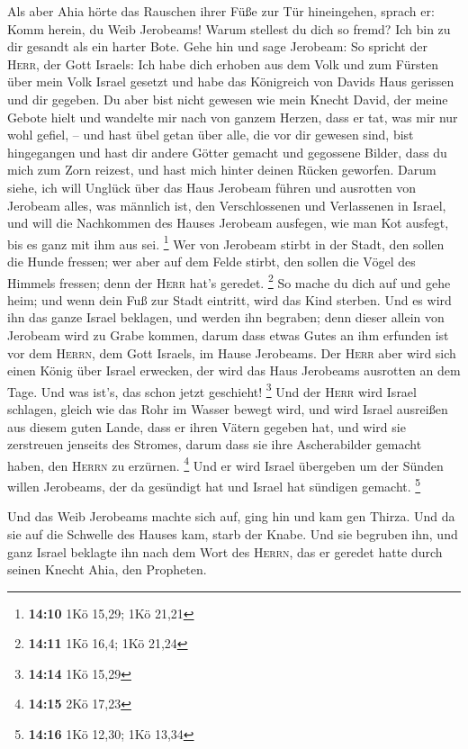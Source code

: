  Als aber Ahia hörte das Rauschen ihrer Füße zur Tür
hineingehen, sprach er: Komm herein, du Weib Jerobeams! Warum stellest
du dich so fremd? Ich bin zu dir gesandt als ein harter Bote.
 Gehe hin und sage Jerobeam: So spricht der \textsc{Herr},
der Gott Israels: Ich habe dich erhoben aus dem Volk und zum Fürsten
über mein Volk Israel gesetzt  und habe das Königreich von
Davids Haus gerissen und dir gegeben. Du aber bist nicht gewesen wie
mein Knecht David, der meine Gebote hielt und wandelte mir nach von
ganzem Herzen, dass er tat, was mir nur wohl gefiel, -- 
und hast übel getan über alle, die vor dir gewesen sind, bist
hingegangen und hast dir andere Götter gemacht und gegossene Bilder,
dass du mich zum Zorn reizest, und hast mich hinter deinen Rücken
geworfen.  Darum siehe, ich will Unglück über das Haus
Jerobeam führen und ausrotten von Jerobeam alles, was männlich ist, den
Verschlossenen und Verlassenen in Israel, und will die Nachkommen des
Hauses Jerobeam ausfegen, wie man Kot ausfegt, bis es ganz mit ihm aus
sei. \footnote{\textbf{14:10} 1Kö 15,29; 1Kö 21,21}  Wer
von Jerobeam stirbt in der Stadt, den sollen die Hunde fressen; wer aber
auf dem Felde stirbt, den sollen die Vögel des Himmels fressen; denn der
\textsc{Herr} hat's geredet. \footnote{\textbf{14:11} 1Kö 16,4; 1Kö
  21,24}  So mache du dich auf und gehe heim; und wenn
dein Fuß zur Stadt eintritt, wird das Kind sterben.  Und
es wird ihn das ganze Israel beklagen, und werden ihn begraben; denn
dieser allein von Jerobeam wird zu Grabe kommen, darum dass etwas Gutes
an ihm erfunden ist vor dem \textsc{Herrn}, dem Gott Israels, im Hause
Jerobeams.  Der \textsc{Herr} aber wird sich einen König
über Israel erwecken, der wird das Haus Jerobeams ausrotten an dem Tage.
Und was ist's, das schon jetzt geschieht! \footnote{\textbf{14:14} 1Kö
  15,29}  Und der \textsc{Herr} wird Israel schlagen,
gleich wie das Rohr im Wasser bewegt wird, und wird Israel ausreißen aus
diesem guten Lande, dass er ihren Vätern gegeben hat, und wird sie
zerstreuen jenseits des Stromes, darum dass sie ihre Ascherabilder
gemacht haben, den \textsc{Herrn} zu erzürnen. \footnote{\textbf{14:15}
  2Kö 17,23}  Und er wird Israel übergeben um der Sünden
willen Jerobeams, der da gesündigt hat und Israel hat sündigen gemacht.
\footnote{\textbf{14:16} 1Kö 12,30; 1Kö 13,34}

 Und das Weib Jerobeams machte sich auf, ging hin und kam
gen Thirza. Und da sie auf die Schwelle des Hauses kam, starb der Knabe.
 Und sie begruben ihn, und ganz Israel beklagte ihn nach
dem Wort des \textsc{Herrn}, das er geredet hatte durch seinen Knecht
Ahia, den Propheten.


